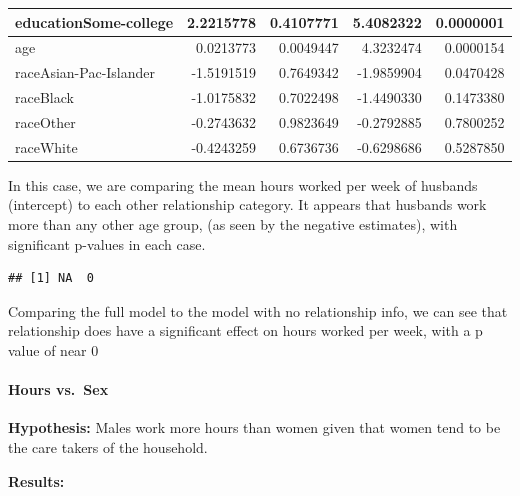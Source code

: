 \documentclass[]{article}
\newenvironment{Shaded}{\begin{snugshade}}{\end{snugshade}}
\newcommand{\KeywordTok}[1]{\textcolor[rgb]{0.13,0.29,0.53}{\textbf{#1}}}
\newcommand{\NormalTok}[1]{#1}
\newcommand{\OperatorTok}[1]{\textcolor[rgb]{0.81,0.36,0.00}{\textbf{#1}}}
\let\oldparagraph\paragraph
\renewcommand{\paragraph}[1]{\oldparagraph{#1}\mbox{}}
\begin{document}
\begin{table}[H]
\begin{tabular}{l|r|r|r|r}
\hline
educationSome-college & 2.2215778 & 0.4107771 & 5.4082322 & 0.0000001\\
\hline
age & 0.0213773 & 0.0049447 & 4.3232474 & 0.0000154\\
\hline
raceAsian-Pac-Islander & -1.5191519 & 0.7649342 & -1.9859904 & 0.0470428\\
\hline
raceBlack & -1.0175832 & 0.7022498 & -1.4490330 & 0.1473380\\
\hline
raceOther & -0.2743632 & 0.9823649 & -0.2792885 & 0.7800252\\
\hline
raceWhite & -0.4243259 & 0.6736736 & -0.6298686 & 0.5287850\\
\hline
\end{tabular}
\end{table}

In this case, we are comparing the mean hours worked per week of
husbands (intercept) to each other relationship category. It appears
that husbands work more than any other age group, (as seen by the
negative estimates), with significant p-values in each case.

\begin{Shaded}
\end{Shaded}

\begin{verbatim}
## [1] NA  0
\end{verbatim}

Comparing the full model to the model with no relationship info, we can
see that relationship does have a significant effect on hours worked per
week, with a p value of near 0

\hypertarget{hours-vs.sex}{%
\paragraph{Hours vs.~Sex}\label{hours-vs.sex}}

\textbf{Hypothesis:} Males work more hours than women given that women
tend to be the care takers of the household.

\textbf{Results:}
\end{document}
